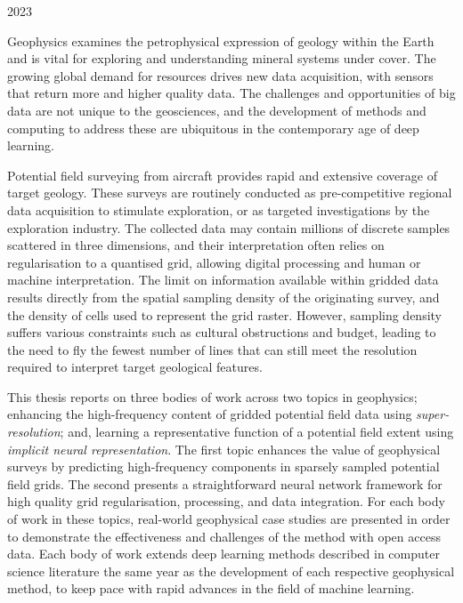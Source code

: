 \documentclass[12pt,a4paper]{report} %
\begin{document}
\begin{titlepage}
        \vspace*{\fill}
        2023
\end{titlepage}

\shipout\null

\setcounter{page}{1}

Geophysics examines the petrophysical expression of geology within the Earth and is vital for exploring and understanding mineral systems under cover.
The growing global demand for resources drives new data acquisition, with sensors that return more and higher quality data.
The challenges and opportunities of big data are not unique to the geosciences, and the development of methods and computing to address these are ubiquitous in the contemporary age of deep learning.

Potential field surveying from aircraft provides rapid and extensive coverage of target geology.
These surveys are routinely conducted as pre-competitive regional data acquisition to stimulate exploration, or as targeted investigations by the exploration industry.
The collected data may contain millions of discrete samples scattered in three dimensions, and their interpretation often relies on regularisation to a quantised grid, allowing digital processing and human or machine interpretation.
The limit on information available within gridded data results directly from the spatial sampling density of the originating survey, and the density of cells used to represent the grid raster.
However, sampling density suffers various constraints such as cultural obstructions and budget, leading to the need to fly the fewest number of lines that can still meet the resolution required to interpret target geological features.

This thesis reports on three bodies of work across two topics in geophysics; enhancing the high-frequency content of gridded potential field data using \emph{super-resolution}; and, learning a representative function of a potential field extent using \emph{implicit neural representation}.
The first topic enhances the value of geophysical surveys by predicting high-frequency components in sparsely sampled potential field grids.
The second presents a straightforward neural network framework for high quality grid regularisation, processing, and data integration.
For each body of work in these topics, real-world geophysical case studies are presented in order to demonstrate the effectiveness and challenges of the method with open access data.
Each body of work extends deep learning methods described in computer science literature the same year as the development of each respective geophysical method, to keep pace with rapid advances in the field of machine learning.
\end{document}
